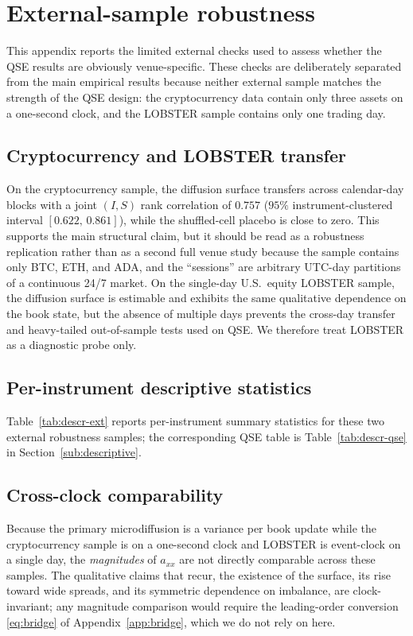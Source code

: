 \documentclass[11pt]{article}
\theoremstyle{plain}
\theoremstyle{definition}
\newcommand{\axx}{a_{xx}}
\begin{document}
\section{External-sample robustness}
\label{app:external}
This appendix reports the limited external checks used to assess whether the QSE
results are obviously venue-specific. These checks are deliberately separated from
the main empirical results because neither external sample matches the strength of
the QSE design: the cryptocurrency data contain only three assets on a one-second
clock, and the LOBSTER sample contains only one trading day.

\subsection{Cryptocurrency and LOBSTER transfer}
\label{app:ext-transfer}
On the cryptocurrency sample, the diffusion surface transfers across calendar-day
blocks with a joint $(I,S)$ rank correlation of $0.757$ ($95\%$
instrument-clustered interval $[0.622,\,0.861]$), while the shuffled-cell placebo is
close to zero. This supports the main structural claim, but it should be read as a
robustness replication rather than as a second full venue study because the sample
contains only BTC, ETH, and ADA, and the ``sessions'' are arbitrary UTC-day
partitions of a continuous 24/7 market. On the single-day U.S.\ equity LOBSTER
sample, the diffusion surface is estimable and exhibits the same qualitative
dependence on the book state, but the absence of multiple days prevents the
cross-day transfer and heavy-tailed out-of-sample tests used on QSE. We therefore
treat LOBSTER as a diagnostic probe only.

\subsection{Per-instrument descriptive statistics}
\label{app:ext-descr}
Table~\ref{tab:descr-ext} reports per-instrument summary statistics for these two
external robustness samples; the corresponding QSE table is
Table~\ref{tab:descr-qse} in Section~\ref{sub:descriptive}.


\subsection{Cross-clock comparability}
\label{app:ext-clock}
Because the primary microdiffusion is a variance per book update while the cryptocurrency
sample is on a one-second clock and LOBSTER is event-clock on a single day, the
\emph{magnitudes} of $\axx$ are not directly comparable across these samples. The
qualitative claims that recur, the existence of the surface, its rise toward wide spreads,
and its symmetric dependence on imbalance, are clock-invariant; any magnitude comparison
would require the leading-order conversion \eqref{eq:bridge} of
Appendix~\ref{app:bridge}, which we do not rely on here.
\end{document}
